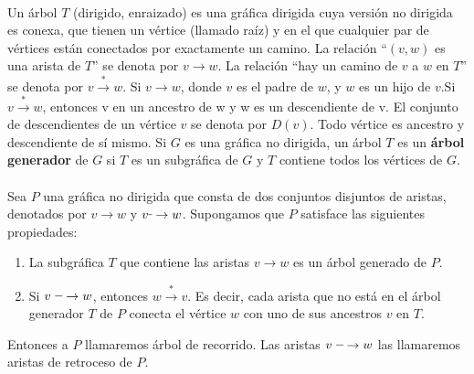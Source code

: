 \paragraph{}
Un árbol $T$ (dirigido, enraizado) es una gráfica dirigida cuya versión no dirigida es conexa, que tienen un vértice (llamado raíz) y en el que cualquier par de vértices están conectados por exactamente un camino. La relación ``$(v, w)$ es una arista de $T$'' se denota por $v \rightarrow w$. La relación ``hay un camino de $v$ a $w$ en $T$'' se denota por $v \overset{\ast}{\rightarrow}  w$. Si $v \rightarrow w$, donde $v$ es el padre de $w$, y $w$ es un hijo de $v$.Si $v \overset{\ast}{\rightarrow} w$, entonces v en un ancestro de w y w es un descendiente de v. El conjunto de descendientes de un vértice $v$ se denota por $D\left(v\right)$. Todo vértice es ancestro y descendiente de sí mismo. Si $G$ es una gráfica no dirigida, un árbol $T$ es un \textbf{árbol generador} de $G$ si $T$ es un subgráfica de $G$ y $T$ contiene todos los vértices de $G$.

\paragraph{}
Sea $P$ una gráfica no dirigida que consta de dos conjuntos disjuntos de aristas, denotados por $v \rightarrow w$ y $v \rule[1mm]{.1cm}{0.4pt} \rightarrow w$. Supongamos que $P$ satisface las siguientes propiedades:
\begin{enumerate}
\item La subgráfica $T$ que contiene las aristas $v \rightarrow w$ es un árbol generado de $P$.
\item Si $v~ \rule[1mm]{.2cm}{0.4pt} \rightarrow w$, entonces $w \overset{\ast}{\rightarrow}  v$. Es decir, cada arista que no está en el árbol generador $T$ de $P$ conecta el vértice $w$ con uno de sus ancestros $v$ en $T$.
\end{enumerate}
Entonces a $P$ llamaremos árbol de recorrido. Las aristas $v~ \rule[1mm]{.2cm}{0.4pt} \rightarrow w$ las llamaremos aristas de retroceso de $P$.

